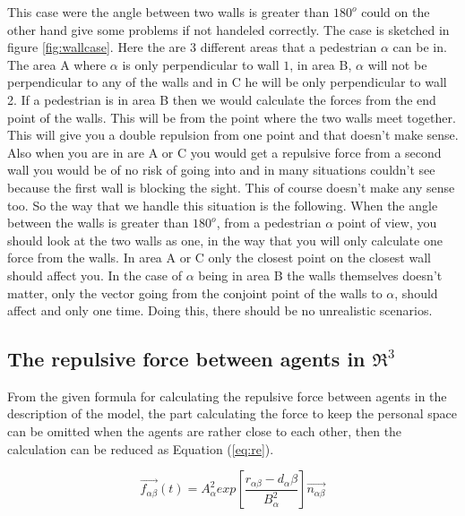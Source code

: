 This case were the angle between two walls is greater than $180^o$ could on the other hand give some problems if not handeled correctly. The case is sketched in figure \ref{fig:wallcase}. Here the are 3 different areas that a pedestrian $\alpha$ can be in. The area A where $\alpha$ is only perpendicular to wall $1$, in area B, $\alpha$ will not be perpendicular to any of the walls and in C he will be only perpendicular to wall 2. If a pedestrian is in area B then we would calculate the forces from the end point of the walls. This will be from the point where the two walls meet together. This will give you a double repulsion from one point and that doesn't make sense. Also when you are in are A or C you would get a repulsive force from a second wall you would be of no risk of going into and in many situations couldn't see because the first wall is blocking the sight. This of course doesn't make any sense too. So the way that we handle this situation is the following. When the angle between the walls is greater than $180^o$, from a pedestrian $\alpha$ point of view, you should look at the two walls as one, in the way that you will only calculate one force from the walls. In area A or C only the closest point on the closest wall should affect you. In the case of $\alpha$ being in area B the walls themselves   doesn't matter, only the vector going from the conjoint point of the walls to $\alpha$, should affect and only one time. Doing this, there should be no unrealistic scenarios.


\subsection{The repulsive force between agents in $ \Re ^{3}$}
From the given formula for calculating the repulsive force between agents in the description of the model, the part calculating the force to keep the personal space can be omitted when the agents are rather close to each other, then the calculation can be reduced as Equation (\ref{eq:re}).

\begin{equation}\label{eq:re}
\overrightarrow{f_{\alpha\beta}}(t) = A_{\alpha}^{2} exp\left[ \frac{r_{\alpha\beta} - d_{\alpha}\beta}{B_{\alpha}^{2}}\right]  \overrightarrow{n_{\alpha\beta}}
\end{equation}

